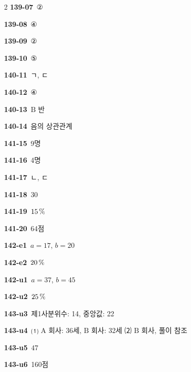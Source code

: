 \documentclass[10pt,a4paper]{article}
\newcommand{\pt}[1]{\mathrm{#1}}
\begin{document}
\begin{multicols}{2}
\noindent\textbf{139-07}\ ②\par
\noindent\textbf{139-08}\ ④\par
\noindent\textbf{139-09}\ ②\par
\noindent\textbf{139-10}\ ⑤\par
\noindent\textbf{140-11}\ ㄱ, ㄷ\par
\noindent\textbf{140-12}\ ④\par
\noindent\textbf{140-13}\ $\pt{B}$ 반\par
\noindent\textbf{140-14}\ 음의 상관관계\par
\noindent\textbf{141-15}\ 9명\par
\noindent\textbf{141-16}\ 4명\par
\noindent\textbf{141-17}\ ㄴ, ㄷ\par
\noindent\textbf{141-18}\ $30$\par
\noindent\textbf{141-19}\ $15\mkern3mu \%$\par
\noindent\textbf{141-20}\ 64점\par
\noindent\textbf{142-e1}\ $a=17$, $b=20$\par
\noindent\textbf{142-e2}\ $20\mkern3mu \%$\par
\noindent\textbf{142-u1}\ $a=37$, $b=45$\par
\noindent\textbf{142-u2}\ $25\mkern3mu \%$\par
\noindent\textbf{143-u3}\ 제1사분위수: 14, 중앙값: 22\par
\noindent\textbf{143-u4}\ ⑴ $\pt{A}$ 회사: 36세, $\pt{B}$ 회사: 32세 ⑵ $\pt{B}$ 회사, 풀이 참조\par
\noindent\textbf{143-u5}\ $47$\par
\noindent\textbf{143-u6}\ 160점\par
\end{multicols}
\end{document}
